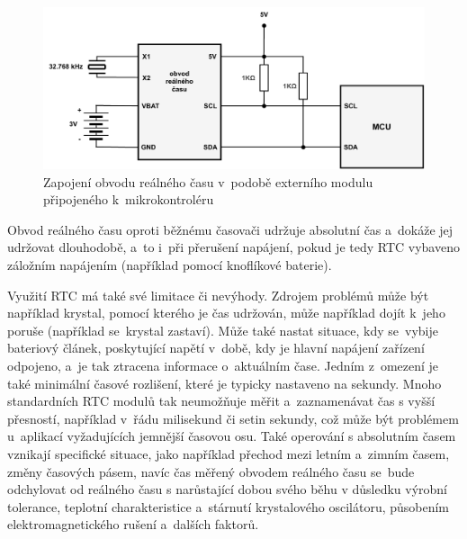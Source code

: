 \begin{figure}[h]
    \centering
    \includegraphics[width=1.00\textwidth]{obrazky-figures/real_time_circuit.pdf}
    
    \caption{Zapojení obvodu reálného času v~podobě externího modulu připojeného k~mikrokontroléru~\cite{embed_journal_interfacing_rtc_with_microcontroler}}
    \label{fig:real-time-circuit}
\end{figure}

Obvod reálného času oproti běžnému časovači udržuje absolutní čas a~dokáže jej udržovat dlouhodobě, a~to i~při přerušení napájení, pokud je tedy RTC vybaveno záložním napájením (například pomocí knoflíkové baterie).

Využití RTC má také své limitace či nevýhody. Zdrojem problémů může být například krystal, pomocí kterého je čas udržován, může například dojít k~jeho poruše (například se~krystal zastaví). Může také nastat situace, kdy se~vybije bateriový článek, poskytující napětí v~době, kdy je hlavní napájení zařízení odpojeno, a~je tak ztracena informace o~aktuálním čase. Jedním z~omezení je také minimální časové rozlišení, které je typicky nastaveno na sekundy. Mnoho standardních RTC modulů tak neumožňuje měřit a~zaznamenávat čas s vyšší přesností, například v~řádu milisekund či setin sekundy, což může být problémem u~aplikací vyžadujících jemnější časovou osu. Také operování s absolutním časem vznikají specifické situace, jako například přechod mezi letním a~zimním časem, změny časových pásem, navíc čas měřený obvodem reálného času se~bude odchylovat od reálného času s narůstající dobou svého běhu v důsledku  výrobní tolerance, teplotní charakteristice a~stárnutí krystalového oscilátoru, působením elektromagnetického rušení a~dalších faktorů.~\cite{jameco_choosing_right_real_time_clock_chip_or_module, embed_journal_interfacing_rtc_with_microcontroler, medium_rtc, ti_rtc}

